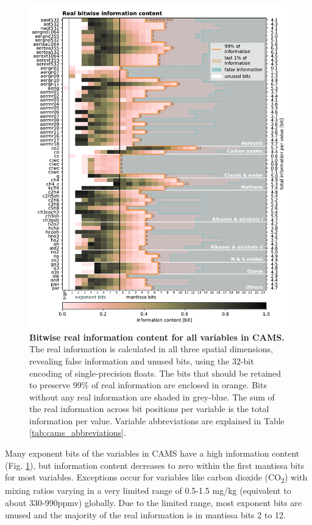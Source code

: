 \begin{figure}[tbhp]
	\includegraphics[width=1\textwidth]{Figures/compression/bitinformation.pdf}
	\caption{\textbf{Bitwise real information content for all variables in CAMS.} 
	The real information is calculated in all three spatial dimensions, revealing false information
	and unused bits, using the 32-bit encoding of single-precision floats. The bits that should be
	retained to preserve 99\% of real information are enclosed in orange. Bits without any real
	information are shaded in grey-blue. The sum of the real information across bit positions
	per variable is the total information per value. Variable abbreviations are explained in Table
	\ref{tab:cams_abbreviations}.}
	\label{fig:bitinformation}
\end{figure}

Many exponent bits of the variables in CAMS have a high information content (Fig. \ref{fig:bitinformation}),
but information content decreases to zero within the first mantissa bits for most variables.
Exceptions occur for variables like carbon dioxide (CO\textsubscript{2}) with mixing ratios varying in a very
limited range of 0.5-1.5 mg/kg (equivalent to about 330-990ppmv) globally. Due to the limited range,
most exponent bits are unused and the majority of the real information is in mantissa bits 2 to 12.

